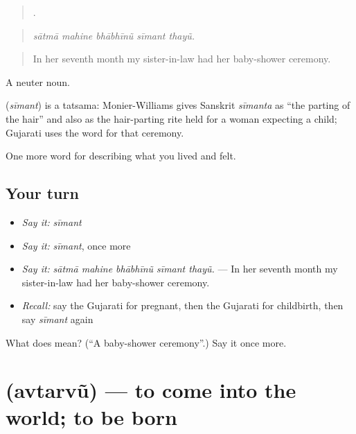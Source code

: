 \begin{quote}
    .
\end{quote}

\begin{quote}
\emph{sātmā mahine bhābhīnũ sīmant thayũ.}
\end{quote}

\begin{quote}
In her seventh month my sister-in-law had her baby-shower ceremony.
\end{quote}

A neuter noun.

\begin{cousinweb}
\textbf{} (\emph{sīmant}) is a tatsama: Monier-Williams gives Sanskrit \emph{sīmanta} as \textquotedblleft{}the parting of the hair\textquotedblright{} and also as the hair-parting rite held for a woman expecting a child; Gujarati uses the word for that ceremony.
\end{cousinweb}

\begin{grammarlens}[title={What you've built}]
One more word for describing what you lived and felt.
\end{grammarlens}

\subsection*{Your turn}
\begin{itemize}
\raggedright
  \item \emph{Say it:} \emph{sīmant}
  \item \emph{Say it:} \emph{sīmant}, once more
  \item \emph{Say it:} \emph{sātmā mahine bhābhīnũ sīmant thayũ.} — In her seventh month my sister-in-law had her baby-shower ceremony.
  \item \emph{Recall:} say the Gujarati for pregnant, then the Gujarati for childbirth, then say \emph{sīmant} again
\end{itemize}

\begin{tcolorbox}[breakable,colback=teal!4,colframe=teal!35!black,title={Before you move on}]
What does  mean? (\textquotedblleft{}A baby-shower ceremony\textquotedblright{}.) Say it once more.
\end{tcolorbox}
\section[\texorpdfstring{\gu{અવતરવું} (avtarvũ)}{અવતરવું (avtarvũ)}]{ (avtarvũ) — to come into the world; to be born}


